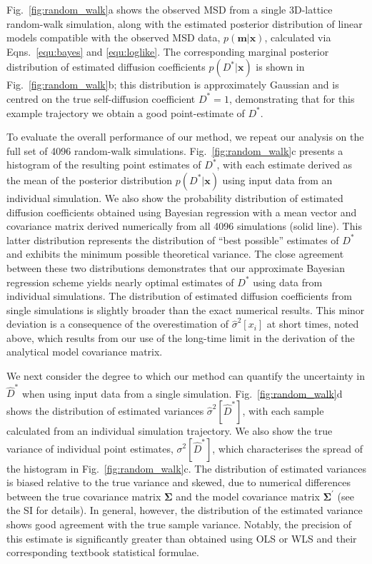 \documentclass[reprint,superscriptaddress,nobibnotes,amsmath,amssymb,aps,prx,hidelinks]{revtex4-2}
\newcommand{\oMSD}{\ensuremath{\bm{x}}}
\newcommand{\oMSDi}{\ensuremath{x_i}}
\newcommand{\model}{\bm{m}}
\newcommand{\prob}[1]{\ensuremath{p(#1)}}
\newcommand{\Dest}{\ensuremath{\widehat{D}^*}}
\newcommand{\D}{\ensuremath{D^*}}
\newcommand{\var}[1]{\ensuremath{\sigma^2[#1]}}
\newcommand{\varest}[1]{\ensuremath{\widehat{\sigma}^2[#1]}}
\begin{document}
Fig.~\ref{fig:random_walk}a shows the observed MSD from a single 3D-lattice random-walk simulation, along with the estimated posterior distribution of linear models compatible with the observed MSD data, $\prob{\model|\oMSD}$, calculated via Eqns.~\ref{equ:bayes} and \ref{equ:loglike}.
The corresponding marginal posterior distribution of estimated diffusion coefficients $\prob{\D|\oMSD}$ is shown in Fig.~\ref{fig:random_walk}b; this distribution is approximately Gaussian and is centred on the true self-diffusion coefficient $\D = \num{1}$, demonstrating that for this example trajectory we obtain a good point-estimate of $\D$.

To evaluate the overall performance of our method, we repeat our analysis on the full set of \num{4096} random-walk simulations.
Fig.~\ref{fig:random_walk}c presents a histogram of the resulting point estimates of $\D$, with each estimate derived as the mean of the posterior distribution $\prob{\D|\oMSD}$ using input data from an individual simulation.
We also show the probability distribution of estimated diffusion coefficients obtained using Bayesian regression with a mean vector and covariance matrix derived numerically from all \num{4096} simulations (solid line).
This latter distribution represents the distribution of ``best possible'' estimates of $\D$ and exhibits the minimum possible theoretical variance.
The close agreement between these two distributions demonstrates that our approximate Bayesian regression scheme yields nearly optimal estimates of $\D$ using data from individual simulations.
The distribution of estimated diffusion coefficients from single simulations is slightly broader than the exact numerical results.
This minor deviation is a consequence of the overestimation of $\varest{\oMSDi}$ at short times, noted above, which results from our use of the long-time limit in the derivation of the analytical model covariance matrix.

We next consider the degree to which our method can quantify the uncertainty in $\Dest$ when using input data from a single simulation.
Fig.~\ref{fig:random_walk}d shows the distribution of estimated variances $\varest{\Dest}$, with each sample calculated from an individual simulation trajectory.
We also show the true variance of individual point estimates, $\var{\Dest}$, which characterises the spread of the histogram in Fig.~\ref{fig:random_walk}c.
The distribution of estimated variances is biased relative to the true variance and skewed, due to numerical differences between the true covariance matrix $\mathbf{\Sigma}$ and the model covariance matrix $\mathbf{\Sigma^\prime}$ (see the SI for details).
In general, however, the distribution of the estimated variance shows good agreement with the true sample variance.
Notably, the precision of this estimate is significantly greater than obtained using OLS or WLS and their corresponding textbook statistical formulae.
\end{document}
